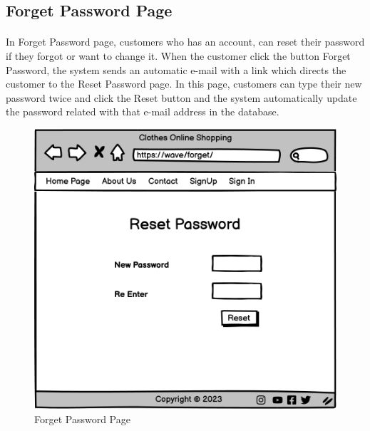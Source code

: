 \subsection{Forget Password Page}
\bigskip
\paragraph{}
In Forget Password page, customers who has an account, can reset their password if they forgot or want to change it. When the customer click the button Forget Password, the system sends an automatic e-mail with a link which directs the customer to the Reset Password page. In this page, customers can type their new password twice and click the Reset button and the system automatically update the password related with that e-mail address in the database. 
\bigskip
\bigskip
\bigskip
\begin{figure}[h]
\centerline{\includegraphics[scale=1.]{images/Forget Password.png}}
\caption{Forget Password Page}
\label{fig}
\end{figure}